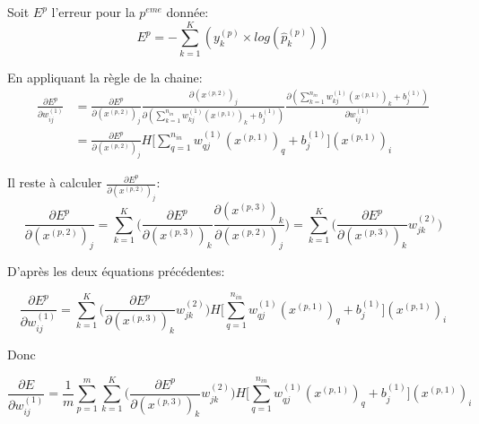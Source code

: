 \documentclass[a4paper,11pt,oneside,roman]{article}
\begin{document}
    Soit $E^p$ l'erreur pour la $p^{eme}$ donnée:
    \begin{equation}
        E^p = - \sum\limits_{k=1}^K (y_{k}^{(p)} \times log(\hat{p}_{k}^{(p)}))
    \end{equation}

    En appliquant la règle de la chaine:
    \begin{equation}
        \begin{aligned}
            \frac{\partial E^p}{\partial w_{ij}^{(1)}} & = \frac{\partial E^p}{\partial (x^{(p,2)})_j} \frac{\partial (x^{(p,2)})_j}{\partial (\sum\limits_{k=1}^{n_{in}} w_{kj}^{(1)}(x^{(p,1)})_{k} + b_j^{(1)})} \frac{\partial (\sum\limits_{k=1}^{n_{in}} w_{kj}^{(1)}(x^{(p,1)})_{k} + b_j^{(1)})}{\partial w_{ij}^{(1)}} \\
            & = \frac{\partial E^p}{\partial (x^{(p,2)})_j} H\big[\sum\limits_{q=1}^{n_{in}} w_{qj}^{(1)}(x^{(p,1)})_{q} + b_j^{(1)}\big] (x^{(p,1)})_i
        \end{aligned}
    \end{equation}

    Il reste à calculer $\frac{\partial E^p}{\partial (x^{(p,2)})_j}$:
    \begin{equation}
        \frac{\partial E^p}{\partial (x^{(p,2)})_j}  = \sum\limits_{k=1}^{K} \Big(\frac{\partial E^p}{\partial (x^{(p,3)})_k} \frac{\partial (x^{(p,3)})_k}{\partial (x^{(p,2)})_j}\Big) = \sum\limits_{k=1}^{K} \Big(\frac{\partial E^p}{\partial (x^{(p,3)})_k} w_{jk}^{(2)}\Big)
    \end{equation}

    D'après les deux équations précédentes:

    \begin{equation}
        \frac{\partial E^p}{\partial w_{ij}^{(1)}} = \sum\limits_{k=1}^{K} \Big(\frac{\partial E^p}{\partial (x^{(p,3)})_k} w_{jk}^{(2)}\Big) H\big[\sum\limits_{q=1}^{n_{in}} w_{qj}^{(1)}(x^{(p,1)})_{q} + b_j^{(1)}\big] (x^{(p,1)})_i
    \end{equation}

    Donc

    \begin{equation}
        \frac{\partial E}{\partial w_{ij}^{(1)}} = \frac{1}{m}\sum\limits_{p=1}^{m}\sum\limits_{k=1}^{K} \Big(\frac{\partial E^p}{\partial (x^{(p,3)})_k} w_{jk}^{(2)}\Big) H\big[\sum\limits_{q=1}^{n_{in}} w_{qj}^{(1)}(x^{(p,1)})_{q} + b_j^{(1)}\big] (x^{(p,1)})_i
        \label{backprop}
    \end{equation}
\end{document}
